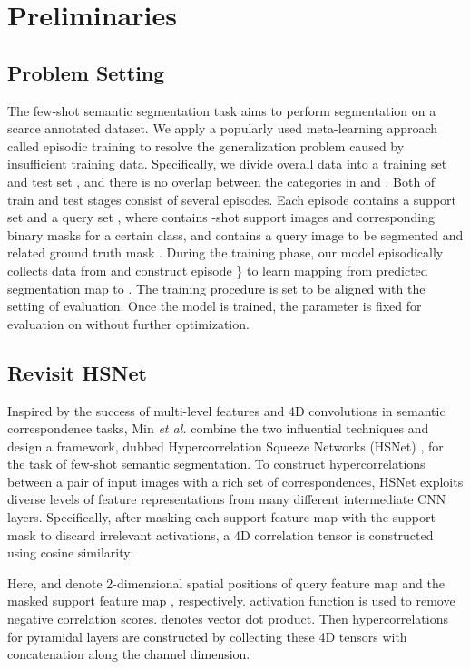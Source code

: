 \documentclass[journal]{IEEEtran}
\def\al{\emph{et al. }}
\begin{document}
\section{Preliminaries}
\label{preliminaries}
\subsection{Problem Setting}

The few-shot semantic segmentation task aims to perform segmentation on a scarce annotated dataset. We apply a popularly used meta-learning approach called episodic training to resolve the generalization problem caused by insufficient training data. Specifically, we divide overall data into a training set  and test set , and there is no overlap between the categories in  and . Both of train and test stages consist of several episodes. Each episode contains a support set  and a query set , where  contains -shot support images  and corresponding binary masks  for a certain class, and  contains a query image  to be segmented and related ground truth mask . During the training phase, our model episodically collects data from  and construct episode \} to learn mapping from predicted segmentation map to . The training procedure is set to be aligned with the setting of evaluation. Once the model is trained, the parameter is fixed for evaluation on  without further optimization.


\subsection{Revisit HSNet}
Inspired by the success of multi-level features and 4D convolutions in semantic correspondence tasks, Min \al combine the two influential techniques and design a framework, dubbed Hypercorrelation Squeeze Networks (HSNet) \cite{min2021hypercorrelation}, for the task of few-shot semantic segmentation. To construct hypercorrelations between a pair of input images with a rich set of correspondences, HSNet exploits diverse levels of feature representations from many different intermediate CNN layers. Specifically, after masking each support feature map with the support mask to discard irrelevant activations, a 4D correlation tensor is constructed using cosine similarity:
	
	Here,  and   denote 2-dimensional spatial positions of query feature map  and the masked support feature map , respectively.  activation function is used to remove negative correlation scores.  denotes vector dot product. Then hypercorrelations for pyramidal layers are constructed by collecting these 4D tensors with concatenation along the channel dimension. 
	
\end{document}

